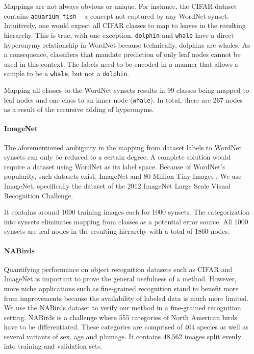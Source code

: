 \documentclass[10pt,twocolumn,letterpaper]{article}
\begin{document}
Mappings are not always obvious or unique. For instance, the CIFAR dataset contains
\texttt{aquarium\_fish} -- a concept not captured by any WordNet synset.
Intuitively, one would expect all CIFAR classes to map to leaves in the resulting
hierarchy. This is true, with one exception. \texttt{dolphin} and \texttt{whale} have
a direct hyperonymy relationship in WordNet because technically, dolphins are whales.
As a consequence, classifiers that mandate prediction of only leaf nodes cannot be
used in this context. The labels need to be encoded in a manner that allows a sample
to be a \texttt{whale}, but not a \texttt{dolphin}.

Mapping all classes to the WordNet synsets results in 99 classes being mapped to leaf nodes
and one class to an inner node (\texttt{whale}). In total, there are 267 nodes as a result of
the recursive adding of hyperonyms. 

\paragraph{ImageNet} 
The aforementioned ambiguity in the mapping from dataset labels to WordNet synsets
can only be reduced to a certain degree. A complete solution would require a
dataset using WordNet as its label space. Because of WordNet's popularity, such
datasets exist, \eg ImageNet \cite{Deng2009ImageNet} and 80 Million Tiny Images \cite{Torralba2008Tiny}.
We use ImageNet, specifically the dataset of the 2012 ImageNet Large Scale Visual Recognition Challenge.

It contains around 1000 training images each for
1000 synsets. The categorization into synsets eliminates mapping from classes as a potential error source.
All 1000 synsets are leaf nodes in the resulting hierarchy with a total of 1860 nodes.

\paragraph{NABirds}
Quantifying performance on object recognition datasets such as CIFAR and
ImageNet is important to prove the general usefulness of a method. However, more niche applications
such as fine-grained recognition stand to benefit more from improvements because the availability
of labeled data is much more limited.
We use the NABirds dataset \cite{VanHorn2015NAB} to verify our method in a fine-grained recognition
setting. NABirds is a challenge where 555 categories of North American birds have to be differentiated.
These categories are comprised of 404 species as well as several variants of sex, age and plumage.
It contains 48,562 images split evenly into training and validation sets.
\end{document}
